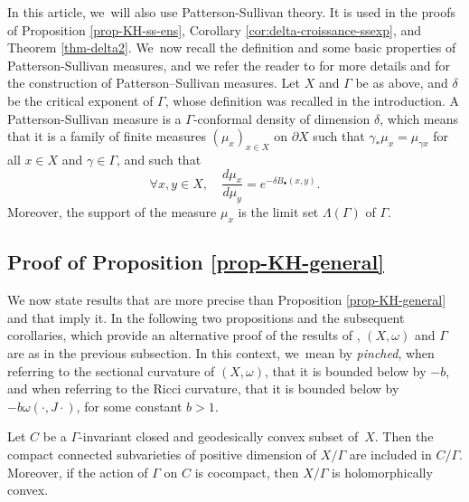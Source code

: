 In this article, we~will also use Patterson-Sullivan theory. It is used in the proofs of Proposition \ref{prop-KH-ss-ens}, Corollary \ref{cor:delta-croissance-ssexp}, and Theorem \ref{thm-delta2}. We~now recall the definition and some basic properties of Patterson-Sullivan measures, and we refer the reader to \cite{roblinErgodiciteEquidistributionCourbure2003,pattersonLimitSetFuchsian1976, sullivanDensityInfinityDiscrete1979, nichollsErgodicTheoryDiscrete1989} for more details and for the construction of Patterson--Sullivan measures. Let $X$ and $\Gamma$ be as above, and $\delta$ be the critical exponent of $\Gamma$, whose definition was recalled in the introduction. A Patterson-Sullivan measure is a $\Gamma$\nobreakdash-conformal density of dimension $\delta$, which means that it is a family of finite measures $(\mu_x)_{x\in X}$ on $\partial X$ such that $\gamma_*\mu_x = \mu_{\gamma x}$ for all $x\in X$ and $\gamma\in \Gamma$, and such that
\begin{equation}\label{eq-prop-PS}
\forall x,y\in X,\quad \frac{d\mu_x}{d\mu_y}=e^{-\delta B_{\bullet}(x,y)}. \end{equation}
Moreover, the support of the measure $\mu_x$ is the limit set $\Lambda(\Gamma)$ of $\Gamma$.

\subsection{Proof of Proposition \ref{prop-KH-general}}\label{ss-section-preuve-prop5}

We now state results that are more precise than Proposition \ref{prop-KH-general} and that imply it. In the following two propositions and the subsequent corollaries, which provide an alternative proof of the results of \cite{deyNoteComplexhyperbolicKleinian2020}, $(X,\omega)$ and $\Gamma$ are as in the previous subsection. In this context, we~mean by \textit{pinched}, when referring to the sectional curvature of $(X,\omega)$, that it is bounded below by $-b$, and when referring to the Ricci curvature, that it is bounded below by $-b\omega(\cdot,J\cdot)$, for some constant $b>1$.

\begin{proposition}\label{prop-KH-hol-cvx}
Let $C$ be a $\Gamma$\nobreakdash-invariant closed and geodesically convex subset of~$X$. Then the compact connected subvarieties of positive dimension of $X/\Gamma$ are included in $C/\Gamma$. Moreover, if the action of $\Gamma$ on $C$ is cocompact, then $X/\Gamma$ is holomorphically convex.
\end{proposition}

